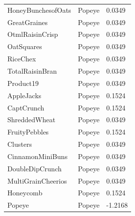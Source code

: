 \begin{table}[!htbp]
\begin{tabular}{lll}
HoneyBunchesofOats & Popeye & 0.0349
\\
GreatGraines & Popeye & 0.0349
\\
OtmlRaisinCrisp & Popeye & 0.0349
\\
OatSquares & Popeye & 0.0349
\\
RiceChex & Popeye & 0.0349
\\
TotalRaisinBran & Popeye & 0.0349
\\
Product19 & Popeye & 0.0349
\\
AppleJacks & Popeye & 0.1524
\\
CaptCrunch & Popeye & 0.1524
\\
ShreddedWheat & Popeye & 0.0349
\\
FruityPebbles & Popeye & 0.1524
\\
Clusters & Popeye & 0.0349
\\
CinnamonMiniBuns & Popeye & 0.0349
\\
DoubleDipCrunch & Popeye & 0.0349
\\
MultiGrainCheerios & Popeye & 0.0349
\\
Honeycomb & Popeye & 0.1524
\\
Popeye & Popeye & -1.2168
\\
\hline
\end{tabular}
\end{table}
